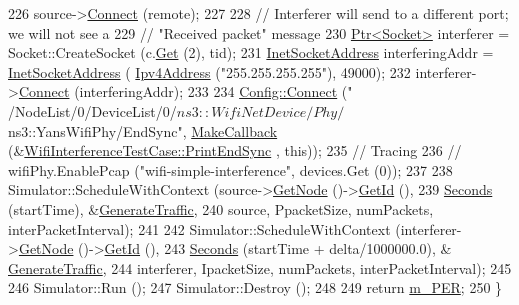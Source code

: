 \begin{DoxyCode}
226   source->\hyperlink{classns3_1_1Socket_a97f08aaf37b8fd7d4b5cad4dfdd4022a}{Connect} (remote);
227 
228   \textcolor{comment}{// Interferer will send to a different port; we will not see a}
229   \textcolor{comment}{// "Received packet" message}
230   \hyperlink{classns3_1_1Ptr}{Ptr<Socket>} interferer = Socket::CreateSocket (c.\hyperlink{classns3_1_1NodeContainer_a9ed96e2ecc22e0f5a3d4842eb9bf90bf}{Get} (2), tid);
231   \hyperlink{classns3_1_1InetSocketAddress}{InetSocketAddress} interferingAddr = \hyperlink{classns3_1_1InetSocketAddress}{InetSocketAddress} (
      \hyperlink{classns3_1_1Ipv4Address}{Ipv4Address} (\textcolor{stringliteral}{"255.255.255.255"}), 49000);
232   interferer->\hyperlink{classns3_1_1Socket_a97f08aaf37b8fd7d4b5cad4dfdd4022a}{Connect} (interferingAddr);
233 
234   \hyperlink{group__config_ga4014f151241cd0939b6cb64409605736}{Config::Connect} (\textcolor{stringliteral}{"
      /NodeList/0/DeviceList/0/$ns3::WifiNetDevice/Phy/$ns3::YansWifiPhy/EndSync"}, \hyperlink{group__makecallbackmemptr_ga9376283685aa99d204048d6a4b7610a4}{MakeCallback} (&\hyperlink{classWifiInterferenceTestCase_aa18e53673390dc3e3eb6e0f32b85f9ef}{WifiInterferenceTestCase::PrintEndSync}
      , \textcolor{keyword}{this})); 
235   \textcolor{comment}{// Tracing}
236 \textcolor{comment}{//  wifiPhy.EnablePcap ("wifi-simple-interference", devices.Get (0));}
237 
238   Simulator::ScheduleWithContext (source->\hyperlink{classns3_1_1Socket_aba642ad4301c1df47befc0aa9afa2e48}{GetNode} ()->\hyperlink{classns3_1_1Node_aaf49b64a843565ce3812326313b370ac}{GetId} (),
239                                   \hyperlink{group__timecivil_ga33c34b816f8ff6628e33d5c8e9713b9e}{Seconds} (startTime), &\hyperlink{classWifiInterferenceTestCase_a5ad509bd0112e0cf6de835cd4cabbb2b}{GenerateTraffic},
240                                   source, PpacketSize, numPackets, interPacketInterval);
241 
242   Simulator::ScheduleWithContext (interferer->\hyperlink{classns3_1_1Socket_aba642ad4301c1df47befc0aa9afa2e48}{GetNode} ()->\hyperlink{classns3_1_1Node_aaf49b64a843565ce3812326313b370ac}{GetId} (),
243                                   \hyperlink{group__timecivil_ga33c34b816f8ff6628e33d5c8e9713b9e}{Seconds} (startTime + delta/1000000.0), &
      \hyperlink{classWifiInterferenceTestCase_a5ad509bd0112e0cf6de835cd4cabbb2b}{GenerateTraffic},
244                                   interferer, IpacketSize, numPackets, interPacketInterval);
245 
246   Simulator::Run ();
247   Simulator::Destroy ();
248 
249   \textcolor{keywordflow}{return} \hyperlink{classWifiInterferenceTestCase_ab810c2782277c76c886528e0b9d20537}{m\_PER};
250 \}
\end{DoxyCode}


